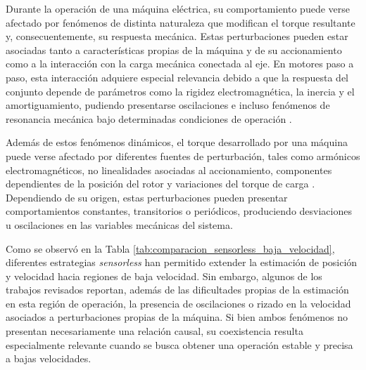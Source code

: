 Durante la operación de una máquina eléctrica, su comportamiento puede verse afectado por fenómenos de distinta naturaleza que modifican el torque resultante y, consecuentemente, su respuesta mecánica. Estas perturbaciones pueden estar asociadas tanto a características propias de la máquina y de su accionamiento como a la interacción con la carga mecánica conectada al eje. En motores paso a paso, esta interacción adquiere especial relevancia debido a que la respuesta del conjunto depende de parámetros como la rigidez electromagnética, la inercia y el amortiguamiento, pudiendo presentarse oscilaciones e incluso fenómenos de resonancia mecánica bajo determinadas condiciones de operación \cite{vierbergenPredictingImprovingBehaviour}.

Además de estos fenómenos dinámicos, el torque desarrollado por una máquina puede verse afectado por diferentes fuentes de perturbación, tales como armónicos electromagnéticos, no linealidades asociadas al accionamiento, componentes dependientes de la posición del rotor y variaciones del torque de carga \cite{deangeloControlParaMaquinas2004}. Dependiendo de su origen, estas perturbaciones pueden presentar comportamientos constantes, transitorios o periódicos, produciendo desviaciones u oscilaciones en las variables mecánicas del sistema.
%
%
%
%
%
%
%
%
%
%
%
%
%

Como se observó en la Tabla \ref{tab:comparacion_sensorless_baja_velocidad}, diferentes estrategias \textit{sensorless} han permitido extender la estimación de posición y velocidad hacia regiones de baja velocidad. Sin embargo, algunos de los trabajos revisados reportan, además de las dificultades propias de la estimación en esta región de operación, la presencia de oscilaciones o rizado en la velocidad asociados a perturbaciones propias de la máquina. Si bien ambos fenómenos no presentan necesariamente una relación causal, su coexistencia resulta especialmente relevante cuando se busca obtener una operación estable y precisa a bajas velocidades.


